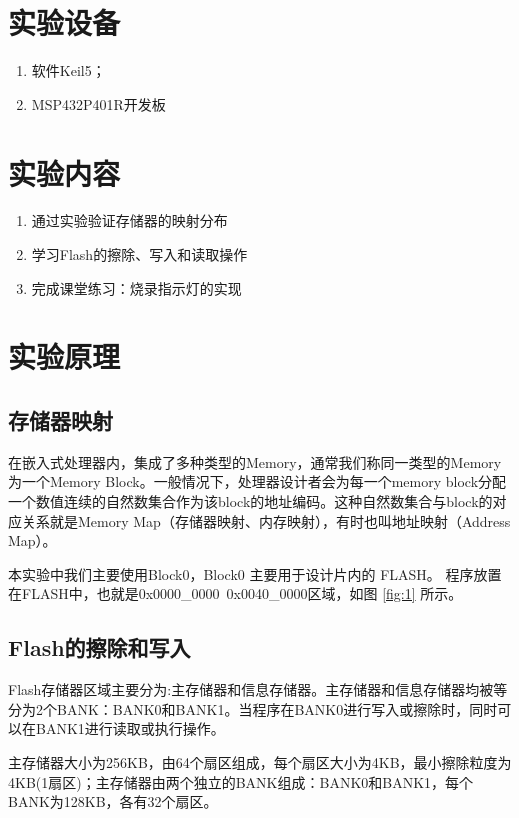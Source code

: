 \documentclass[a4paper,10pt,UTF8]{paper}
\numberwithin{equation}{section}
\numberwithin{figure}{section}
\begin{document}
\section{实验设备}

\begin{enumerate}
  \item 软件Keil5；
  \item MSP432P401R开发板
\end{enumerate}

\section{实验内容}

\begin{enumerate}
  \item 通过实验验证存储器的映射分布
  \item 学习Flash的擦除、写入和读取操作
  \item 完成课堂练习：烧录指示灯的实现
\end{enumerate}

\section{实验原理}

\subsection{存储器映射}


在嵌入式处理器内，集成了多种类型的Memory，通常我们称同一类型的Memory为一个Memory Block。一般情况下，处理器设计者会为每一个memory block分配一个数值连续的自然数集合作为该block的地址编码。这种自然数集合与block的对应关系就是Memory Map（存储器映射、内存映射），有时也叫地址映射（Address Map）。

本实验中我们主要使用Block0，Block0 主要用于设计片内的 FLASH。 程序放置在FLASH中，也就是0x0000\_0000~0x0040\_0000区域，如图 \ref{fig:1} 所示。

\subsection{Flash的擦除和写入}

Flash存储器区域主要分为:主存储器和信息存储器。主存储器和信息存储器均被等分为2个BANK：BANK0和BANK1。当程序在BANK0进行写入或擦除时，同时可以在BANK1进行读取或执行操作。

主存储器大小为256KB，由64个扇区组成，每个扇区大小为4KB，最小擦除粒度为4KB(1扇区)；主存储器由两个独立的BANK组成：BANK0和BANK1，每个BANK为128KB，各有32个扇区。
\end{document}
